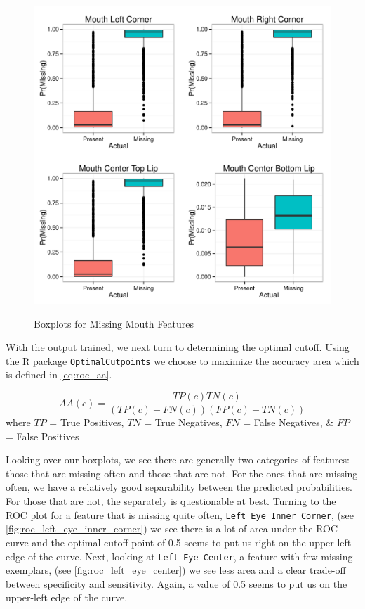\documentclass[journal]{IEEEtran}
\begin{document}
\begin{figure}[!ht]
  \centering
  \caption{Boxplots for Missing Mouth Features}
  \includegraphics[scale=.5]{logistic_boxplots_mouth.pdf}
  \label{fig:logistic_boxplots_mouth}
\end{figure}


With the output trained, we next turn to determining the optimal cutoff.  Using the R package \texttt{OptimalCutpoints} we choose to maximize the accuracy area \cite{lewis2008use,greiner1995two,greiner1996two} which is defined in \cref{eq:roc_aa}.

\[\label{eq:roc_aa}
AA(c)=\frac{TP(c)TN(c)}{(TP(c)+FN(c))(FP(c)+TN(c))}
\]
where $TP$ = True Positives, $TN$ = True Negatives, $FN$ = False Negatives, \& $FP$ = False Positives

Looking over our boxplots, we see there are generally two categories of features: those that are missing often and those that are not.  For the ones that are missing often, we have a relatively good separability between the predicted probabilities.  For those that are not, the separately is questionable at best.  Turning to the ROC plot for a feature that is missing quite often, \texttt{Left Eye Inner Corner}, (see \cref{fig:roc_left_eye_inner_corner}) we see there is a lot of area under the ROC curve and the optimal cutoff point of 0.5 seems to put us right on the upper-left edge of the curve.  Next, looking at \texttt{Left Eye Center}, a feature with few missing exemplars, (see \cref{fig:roc_left_eye_center}) we see less area and a clear trade-off between specificity and sensitivity.  Again, a value of 0.5 seems to put us on the upper-left edge of the curve.
\end{document}
